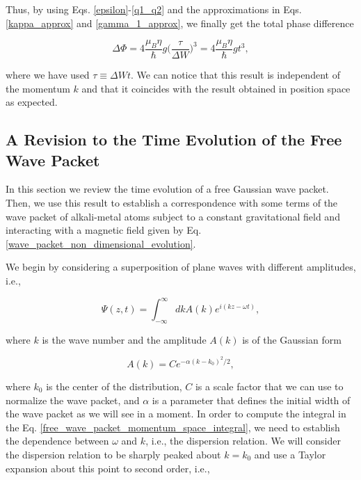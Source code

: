 \documentclass{article}
\begin{document}
Thus, by using Eqs. \ref{epsilon}-\ref{q1_q2} and the approximations in Eqs. \ref{kappa_approx} and \ref{gamma_1_approx}, we finally get the total phase difference

\begin{equation}\label{quantum_gravimetry_signal_momentum_space}
\Delta \Phi = 4 \frac{\mu_{B} \eta }{\hbar} g \bigg(\frac{\tau}{\Delta W}\bigg)^{3} = 4 \frac{\mu_{B} \eta }{\hbar} g t^{3},
\end{equation}

where we have used $\tau\equiv \Delta W t$. We can notice that this result is independent of the momentum $k$ and that it coincides with the result obtained in position space as expected.

\subsection{A Revision to the Time Evolution of the Free Wave Packet}
In this section we review the time evolution of a free Gaussian wave packet. Then, we use this result to establish a correspondence with some terms of the wave packet of alkali-metal atoms subject to a constant gravitational field and interacting with a magnetic field given by Eq. \ref{wave_packet_non_dimensional_evolution}.

We begin by considering a superposition of plane waves with different amplitudes, i.e.,

\begin{equation}\label{free_wave_packet_momentum_space_integral}
    \Psi (z, t) =  \int_{- \infty}^{\infty} dk A(k) e^{i (kz-\omega t)} ,
\end{equation}

where $k$ is the wave number and the amplitude $A(k)$ is of the Gaussian form

\begin{equation}\label{gaussian_amplitude_free_wave_packet}
    A(k) = C e^{-\alpha(k-k_{0})^{2}/2} ,
\end{equation}

where $k_{0}$ is the center of the distribution, $C$ is a scale factor that we can use to normalize the wave packet, and $\alpha$ is a parameter that defines the initial width of the wave packet as we will see in a moment. In order to compute the integral in the Eq. \ref{free_wave_packet_momentum_space_integral}, we need to establish the dependence between $\omega$ and $k$, i.e., the dispersion relation. We will consider the dispersion relation to be sharply peaked about $k=k_{0}$ and use a Taylor expansion about this point to second order, i.e.,
\end{document}
